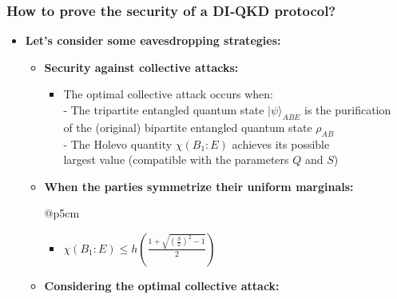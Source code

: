 \documentclass{beamer}
\begin{document}
		\begin{frame}
			\frametitle{\large How to prove the security of a DI‑QKD protocol?}

            \vspace{4ex}
            \begin{itemize}
                \item \textbf{Let's consider some eavesdropping strategies:}
                \begin{itemize}
                    \item \textbf{Security against collective attacks:}
                    \begin{itemize}
                        \item The optimal collective attack occurs when:\\\footnotesize
                        - The tripartite entangled quantum state ${|\psi\rangle}_{ABE}$ is the purification\\\hspace{0.5em}of the (original) bipartite entangled quantum state ${\rho}_{AB}$\\
                        - The Holevo quantity $\chi({B}_{1}:E)$ achieves its possible\\\hspace{0.5em}largest value (compatible with the parameters $Q$ and $S$)
                    \end{itemize}
                    \item \textbf{When the parties symmetrize their uniform marginals:}
                    \begin{blockarray}{@{}p{5cm}}
                        \vspace{-0.9\baselineskip}
                        \begin{itemize}
                            \item $\chi({B}_{1}:E) \leq h\left( \frac{1 + \sqrt{{(\frac{S}{2})}^{2} - 1}}{2} \right)$
                        \end{itemize}
                        \vspace*{-0.9\baselineskip}
                        \vspace*{0.6ex}
                    \end{blockarray}
                    \vspace{-1ex}
                    \item \textbf{Considering the optimal collective attack:}
                    \begin{itemize}

\end{itemize}
\end{itemize}
\end{itemize}
\end{frame}
\end{document}

